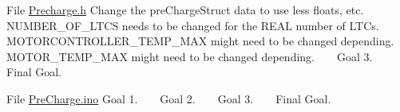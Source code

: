 \begin{DoxyRefList}
\item[File \mbox{\hyperlink{_precharge_8h}{Precharge.h}} ]\label{todo__todo000010}%
%
 Change the pre\+Charge\+Struct data to use less floats, etc. ~\newline
 ~\newline
 NUMBER\+\_\+\+OF\+\_\+\+LTCS needs to be changed for the REAL number of LTCs. MOTORCONTROLLER\+\_\+\+TEMP\+\_\+\+MAX might need to be changed depending. MOTOR\+\_\+\+TEMP\+\_\+\+MAX might need to be changed depending. ~\newline
 ~\newline
 Goal 3. ~\newline
 ~\newline
 Final Goal.  
\item[File \mbox{\hyperlink{_pre_charge_8ino}{Pre\+Charge.ino}} ]\label{todo__todo000011}%
%
 Goal 1. ~\newline
 ~\newline
 Goal 2. ~\newline
 ~\newline
 Goal 3. ~\newline
 ~\newline
 Final Goal. 
\end{DoxyRefList}